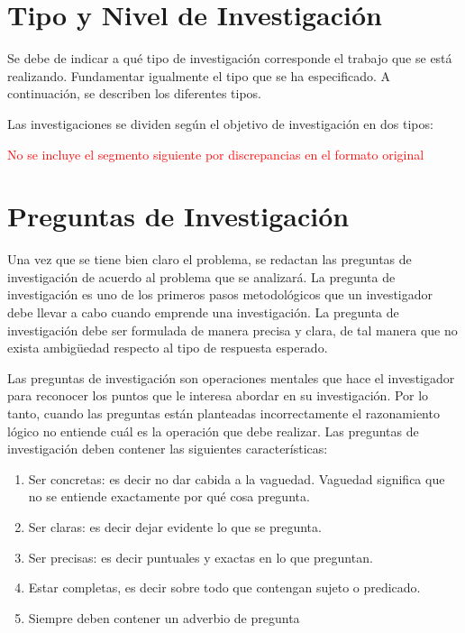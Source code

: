 \documentclass[12]{plan_tesis}
\begin{document}
\section{Tipo y Nivel de Investigación}
Se debe de indicar a qué tipo de investigación corresponde el trabajo que se está realizando. Fundamentar igualmente el tipo que se ha especificado. A continuación, se describen los diferentes tipos. 

Las investigaciones se dividen según el objetivo de investigación en dos tipos:\newline

\textcolor{red}{No se incluye el segmento siguiente por discrepancias en el formato original}

\section{Preguntas de Investigación}
Una vez que se tiene bien claro el problema, se redactan las preguntas de investigación de acuerdo al problema que se analizará. La pregunta de investigación es uno de los primeros pasos metodológicos que un investigador debe llevar a cabo cuando emprende una investigación.
La pregunta de investigación debe ser formulada de manera precisa y clara, de tal manera que no exista ambigüedad respecto al tipo de respuesta esperado.\newline

Las preguntas de investigación son operaciones mentales que hace el investigador para reconocer los puntos que le interesa abordar en su investigación. Por lo tanto, cuando las preguntas están planteadas incorrectamente el razonamiento lógico no entiende cuál es la operación que debe realizar. Las preguntas de investigación deben contener las siguientes características:

\begin{enumerate}
    \item Ser concretas: es decir no dar cabida a la vaguedad. Vaguedad significa que no se entiende exactamente por qué cosa pregunta.
    \item Ser claras: es decir dejar evidente lo que se pregunta.
    \item Ser precisas: es decir puntuales y exactas en lo que preguntan.
    \item Estar completas, es decir sobre todo que contengan sujeto o predicado.
    \item Siempre deben contener un adverbio de pregunta
\end{enumerate}
\end{document}
